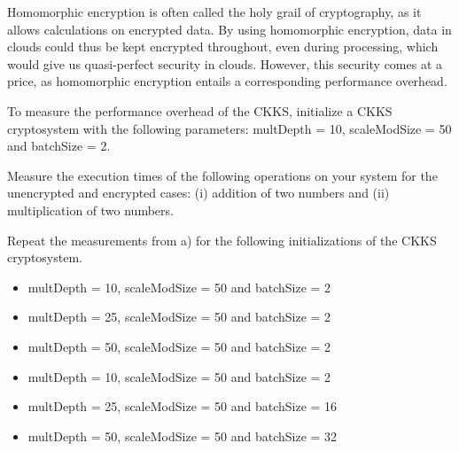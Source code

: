 \begin{aufgabe}

Homomorphic encryption is often called the holy grail of cryptography, as it allows calculations on encrypted data. By using homomorphic encryption, data in clouds could thus be kept encrypted throughout, even during processing, which would give us quasi-perfect security in clouds. However, this security comes at a price, as homomorphic encryption entails a corresponding performance overhead. 


\begin{teilaufgabe}

\item To measure the performance overhead of the CKKS,  initialize a CKKS cryptosystem with the following parameters: multDepth = 10, scaleModSize = 50 and batchSize = 2. 

Measure the execution times of the following operations on your system for the unencrypted and encrypted cases: (i) addition of two numbers and (ii) multiplication of two numbers.

\item Repeat the measurements from a) for the following initializations of the CKKS cryptosystem.

\begin{itemize}
    \item multDepth = 10, scaleModSize = 50 and batchSize = 2
    \item multDepth = 25, scaleModSize = 50 and batchSize = 2
    \item multDepth = 50, scaleModSize = 50 and batchSize = 2
    \item multDepth = 10, scaleModSize = 50 and batchSize = 2
    \item multDepth = 25, scaleModSize = 50 and batchSize = 16
    \item multDepth = 50, scaleModSize = 50 and batchSize = 32
\end{itemize}


\end{teilaufgabe}

\end{aufgabe}




